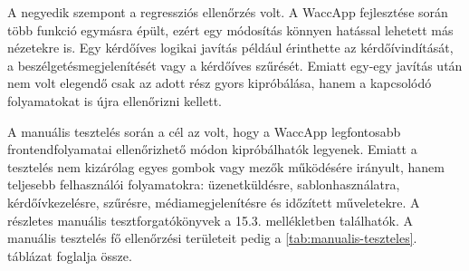 A negyedik szempont a regressziós ellenőrzés volt. A WaccApp fejlesztése során több funkció egymásra épült, ezért egy módosítás könnyen hatással lehetett más nézetekre is. Egy kérdőíves logikai javítás például érinthette az  kérdőívindítását, a  beszélgetésmegjelenítését vagy a  kérdőíves szűrését. Emiatt egy-egy javítás után nem volt elegendő csak az adott rész gyors kipróbálása, hanem a kapcsolódó folyamatokat is újra ellenőrizni kellett.

A manuális tesztelés során a cél az volt, hogy a WaccApp legfontosabb frontendfolyamatai ellenőrizhető módon kipróbálhatók legyenek. Emiatt a tesztelés nem kizárólag egyes gombok vagy mezők működésére irányult, hanem teljesebb felhasználói folyamatokra: üzenetküldésre, sablonhasználatra, kérdőívkezelésre, szűrésre, médiamegjelenítésre és időzített műveletekre. A részletes manuális tesztforgatókönyvek a 15.3. mellékletben találhatók. A manuális tesztelés fő ellenőrzési területeit pedig a \ref{tab:manualis-teszteles}. táblázat foglalja össze.

